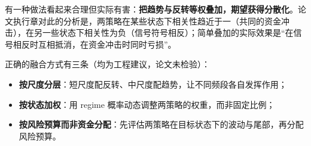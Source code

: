 有一种做法看起来合理但实际有害：\textbf{把趋势与反转等权叠加，期望获得分散化}。论文执行章对此的分析是，两策略在某些状态下相关性趋近于一（共同的资金冲击），在另一些状态下相关性为负（信号符号相反）；简单叠加的实际效果是“在信号相反时互相抵消，在资金冲击时同时亏损”。

正确的融合方式有三条（均为工程建议，论文未检验）：
\begin{itemize}[leftmargin=2.2em]
  \item \textbf{按尺度分层}：短尺度配反转、中尺度配趋势，让不同频段各自发挥作用；
  \item \textbf{按状态加权}：用 regime 概率动态调整两策略的权重，而非固定比例；
  \item \textbf{按风险预算而非资金分配}：先评估两策略在目标状态下的波动与尾部，再分配风险预算。
\end{itemize}
